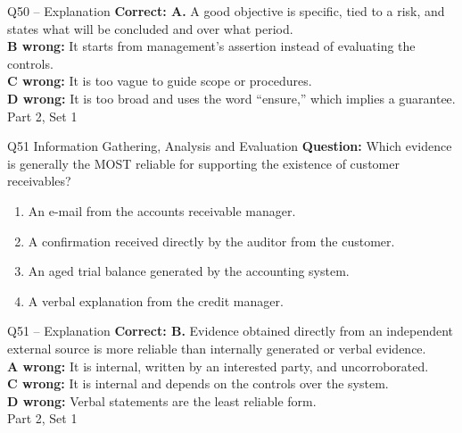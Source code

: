 \documentclass[aspectratio=169,10pt]{beamer}
\begin{document}
\begin{frame}[t]{Q50 -- Explanation}
	\footnotesize
	\textbf{Correct: A.} A good objective is specific, tied to a risk, and states what will be concluded and over what period. \\[5pt]
\textbf{B wrong:} It starts from management's assertion instead of evaluating the controls. \\[3pt]
\textbf{C wrong:} It is too vague to guide scope or procedures. \\[3pt]
\textbf{D wrong:} It is too broad and uses the word ``ensure,'' which implies a guarantee. \\[3pt]
	\vfill {\tiny Part 2, Set 1}
\end{frame}

\begin{frame}[t]{Q51 \hfill {\scriptsize Information Gathering, Analysis and Evaluation}}
	\small
	\textbf{Question:} Which evidence is generally the MOST reliable for supporting the existence of customer receivables?
	\begin{enumerate}[label=\Alph*.,itemsep=1pt,topsep=3pt]
			\item An e-mail from the accounts receivable manager.
			\item A confirmation received directly by the auditor from the customer.
			\item An aged trial balance generated by the accounting system.
			\item A verbal explanation from the credit manager.
	\end{enumerate}
\end{frame}
\begin{frame}[t]{Q51 -- Explanation}
	\footnotesize
	\textbf{Correct: B.} Evidence obtained directly from an independent external source is more reliable than internally generated or verbal evidence. \\[5pt]
\textbf{A wrong:} It is internal, written by an interested party, and uncorroborated. \\[3pt]
\textbf{C wrong:} It is internal and depends on the controls over the system. \\[3pt]
\textbf{D wrong:} Verbal statements are the least reliable form. \\[3pt]
	\vfill {\tiny Part 2, Set 1}
\end{frame}
\end{document}
